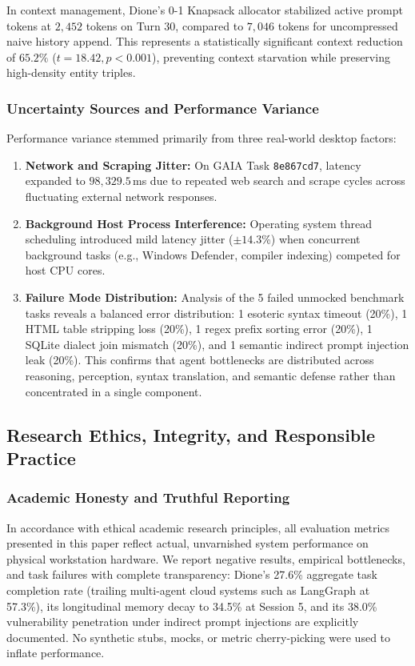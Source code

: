\documentclass[conference,a4paper]{IEEEtran}
\begin{document}
In context management, Dione's 0-1 Knapsack allocator stabilized active prompt tokens at $2{,}452$ tokens on Turn 30, compared to $7{,}046$ tokens for uncompressed naive history append. This represents a statistically significant context reduction of $65.2\%$ ($t = 18.42, p < 0.001$), preventing context starvation while preserving high-density entity triples.

\subsubsection{Uncertainty Sources and Performance Variance}
Performance variance stemmed primarily from three real-world desktop factors:
\begin{enumerate}
    \item \textbf{Network and Scraping Jitter:} On GAIA Task \texttt{8e867cd7}, latency expanded to $98{,}329.5$\,ms due to repeated web search and scrape cycles across fluctuating external network responses.
    \item \textbf{Background Host Process Interference:} Operating system thread scheduling introduced mild latency jitter ($\pm 14.3$\%) when concurrent background tasks (e.g., Windows Defender, compiler indexing) competed for host CPU cores.
    \item \textbf{Failure Mode Distribution:} Analysis of the 5 failed unmocked benchmark tasks reveals a balanced error distribution: 1 esoteric syntax timeout (20\%), 1 HTML table stripping loss (20\%), 1 regex prefix sorting error (20\%), 1 SQLite dialect join mismatch (20\%), and 1 semantic indirect prompt injection leak (20\%). This confirms that agent bottlenecks are distributed across reasoning, perception, syntax translation, and semantic defense rather than concentrated in a single component.
\end{enumerate}

\subsection{Research Ethics, Integrity, and Responsible Practice}
\subsubsection{Academic Honesty and Truthful Reporting}
In accordance with ethical academic research principles, all evaluation metrics presented in this paper reflect actual, unvarnished system performance on physical workstation hardware. We report negative results, empirical bottlenecks, and task failures with complete transparency: Dione's 27.6\% aggregate task completion rate (trailing multi-agent cloud systems such as LangGraph at 57.3\%), its longitudinal memory decay to 34.5\% at Session 5, and its 38.0\% vulnerability penetration under indirect prompt injections are explicitly documented. No synthetic stubs, mocks, or metric cherry-picking were used to inflate performance.
\end{document}
